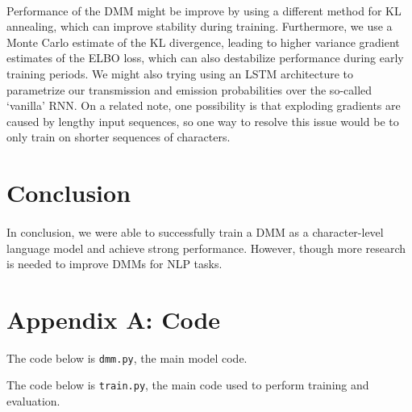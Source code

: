 \documentclass[justified,nobib]{tufte-handout}
\begin{document}
\begin{fullwidth}
\paragraph{} Performance of the DMM might be improve by using a different method for KL annealing, which can improve stability during training. Furthermore, we use a Monte Carlo estimate of the KL divergence, leading to higher variance gradient estimates of the ELBO loss, which can also destabilize performance during early training periods. We might also trying using an LSTM architecture to parametrize our transmission and emission probabilities over the so-called `vanilla' RNN. On a related note, one possibility is that exploding gradients are caused by lengthy input sequences, so one way to resolve this issue would be to only train on shorter sequences of characters. 

\section{Conclusion}

\paragraph{} In conclusion, we were able to successfully train a DMM as a character-level language model and achieve strong performance. However, though more research is needed to improve DMMs for NLP tasks.

{}

\clearpage
\section{Appendix A: Code}
The code below is \texttt{dmm.py}, the main model code. 

\clearpage
The code below is \texttt{train.py}, the main code used to perform training and evaluation.

\end{fullwidth}
\end{document}
